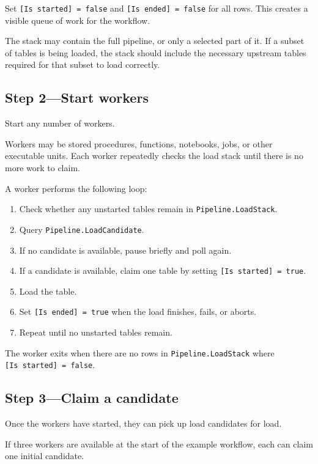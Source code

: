 \documentclass[10pt,openany,10pt]{book}
\providecommand{\tightlist}{%
  \setlength{\itemsep}{0pt}\setlength{\parskip}{0pt}}
\begin{document}
Set \texttt{{[}Is\ started{]}\ =\ false} and
\texttt{{[}Is\ ended{]}\ =\ false} for all rows. This creates a visible
queue of work for the workflow.

The stack may contain the full pipeline, or only a selected part of it.
If a subset of tables is being loaded, the stack should include the
necessary upstream tables required for that subset to load correctly.

\subsection{Step 2---Start workers}\label{step-2start-workers}

Start any number of workers.

Workers may be stored procedures, functions, notebooks, jobs, or other
executable units. Each worker repeatedly checks the load stack until
there is no more work to claim.

A worker performs the following loop:

\begin{enumerate}
\def\labelenumi{\arabic{enumi}.}
\tightlist
\item
  Check whether any unstarted tables remain in
  \texttt{Pipeline.LoadStack}.
\item
  Query \texttt{Pipeline.LoadCandidate}.
\item
  If no candidate is available, pause briefly and poll again.
\item
  If a candidate is available, claim one table by setting
  \texttt{{[}Is\ started{]}\ =\ true}.
\item
  Load the table.
\item
  Set \texttt{{[}Is\ ended{]}\ =\ true} when the load finishes, fails,
  or aborts.
\item
  Repeat until no unstarted tables remain.
\end{enumerate}

The worker exits when there are no rows in \texttt{Pipeline.LoadStack}
where \texttt{{[}Is\ started{]}\ =\ false}.

\subsection{Step 3---Claim a candidate}\label{step-3claim-a-candidate}

Once the workers have started, they can pick up load candidates for
load.

If three workers are available at the start of the example workflow,
each can claim one initial candidate.
\end{document}
